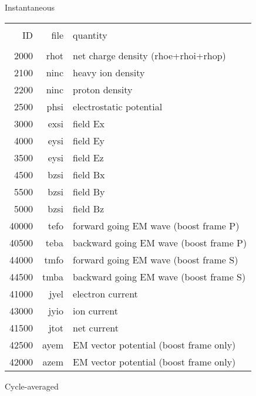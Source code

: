 \documentclass[11pt]{article}
\begin{document}
\noindent Instantaneous\\

\begin{tabular}{rrl}
\hline\\
ID & file & quantity \\
\hline\\
2000 & rhot& net charge density (rhoe+rhoi+rhop) \\ 
2100 & ninc&heavy ion density \\
2200 & ninc&proton density \\
2500 & phsi& electrostatic potential \\
3000 & exsi& field Ex \\
4000 & eysi& field Ey \\
3500 & eysi& field Ez \\
4500 & bzsi& field Bx \\
5500 & bzsi& field By \\
5000 & bzsi& field Bz \\
40000 & tefo& forward going EM wave (boost frame P) \\
40500 & teba& backward going EM wave (boost frame P) \\
44000 & tmfo& forward going EM wave (boost frame S) \\
44500 & tmba& backward going EM wave (boost frame S) \\
41000 & jyel& electron current \\
43000 & jyio& ion current \\
41500 & jtot& net current \\
42500 & ayem& EM vector potential (boost frame only) \\
42000 & azem& EM vector potential (boost frame only) \\
\end{tabular}

\bigskip
\noindent Cycle-averaged\\
\end{document}
